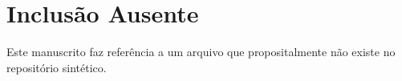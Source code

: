 \documentclass{article}
\begin{document}
\section{Inclusão Ausente}
Este manuscrito faz referência a um arquivo que propositalmente não existe no repositório sintético.

\end{document}
